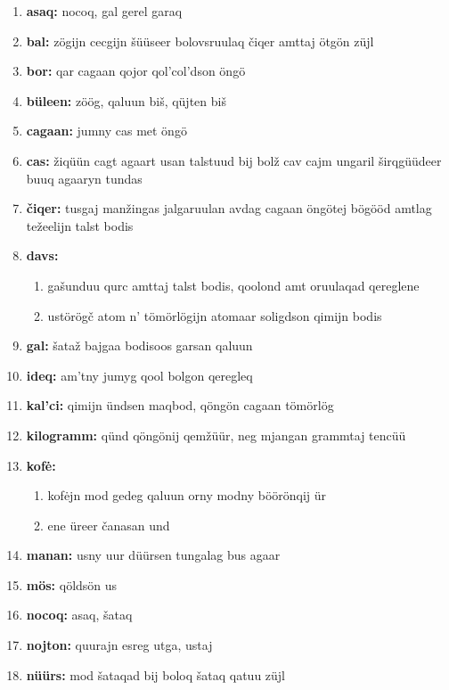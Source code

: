 ﻿\def \monassgt{čiqertej kofė, mjangan žin, neg kilogramm, ötgön manan, qaluun us, qojor utga, quuraj süü, qüjten us, süü uuq, süün qöldmöl, süütej kofė, undny us}
\begin{enumerate}\addtolength{\itemsep}{-0.3\baselineskip}
\item\textbf{asaq:} nocoq, gal gerel garaq
\item\textbf{bal:} zögijn cecgijn šüüseer bolovsruulaq čiqer amttaj ötgön züjl
\item\textbf{bor:} qar cagaan qojor qol’col’dson öngö
\item\textbf{büleen:} zöög, qaluun biš, qüjten biš
\item\textbf{cagaan:} jumny cas met öngö
\item\textbf{cas:} žiqüün cagt agaart usan talstuud bij bolž cav cajm ungaril širqgüüdeer buuq agaaryn tundas
\item\textbf{čiqer:} tusgaj manžingas jalgaruulan avdag cagaan öngötej bögööd amtlag težeelijn talst bodis
\item\textbf{davs:}\begin{enumerate}\item gašunduu qurc amttaj talst bodis, qoolond amt oruulaqad qereglene \item ustörögč atom n’ tömörlögijn atomaar soligdson qimijn bodis\end{enumerate}
\item\textbf{gal:} šataž bajgaa bodisoos garsan qaluun
\item\textbf{ideq:} am’tny jumyg qool bolgon qeregleq
\item\textbf{kal’ci:} qimijn ündsen maqbod, qöngön cagaan tömörlög
\item\textbf{kilogramm:} qünd qöngönij qemžüür, neg mjangan grammtaj tencüü
\item\textbf{kofė:}\begin{enumerate}\item kofėjn mod gedeg qaluun orny modny böörönqij ür \item ene üreer čanasan und\end{enumerate}
\item\textbf{manan:} usny uur düürsen tungalag bus agaar
\item\textbf{mös:} qöldsön us
\item\textbf{nocoq:} asaq, šataq
\item\textbf{nojton:} quurajn esreg utga, ustaj
\item\textbf{nüürs:} mod šataqad bij boloq šataq qatuu züjl

\end{enumerate}
